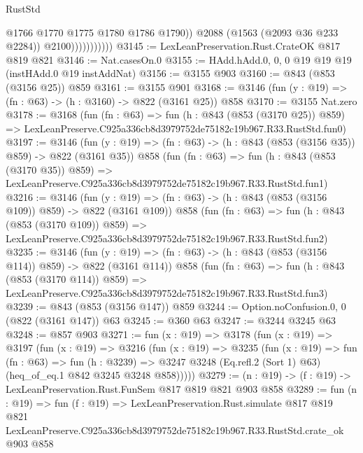 \begin{lexlean}{RustStd}
\begin{coremodule}
                              @1766
                              @1770
                              @1775
                              @1780
                              @1786
                              @1790))
                          @2088
                          (@1563 (@2093 @36 @233 @2284))
                          @2100)))))))))))
@3145 := LexLeanPreservation.Rust.CrateOK @817 @819 @821
@3146 := Nat.casesOn.{0}
@3155 := HAdd.hAdd.{0, 0, 0} @19 @19 @19 (instHAdd.{0} @19 instAddNat)
@3156 := @3155 @903
@3160 := @843 (@853 (@3156 @25)) @859
@3161 := @3155 @901
@3168 := @3146 (fun (y : @19) => (fn : @63) -> (h : @3160) -> @822 (@3161 @25)) @858
@3170 := @3155 Nat.zero
@3178 := @3168
    (fun (fn : @63) =>
    fun (h : @843 (@853 (@3170 @25)) @859) =>
    LexLeanPreserve.C925a336cb8d3979752de75182c19b967.R33.RustStd.fun0)
@3197 := @3146
    (fun (y : @19) => (fn : @63) -> (h : @843 (@853 (@3156 @35)) @859) -> @822 (@3161 @35))
    @858
    (fun (fn : @63) =>
    fun (h : @843 (@853 (@3170 @35)) @859) =>
    LexLeanPreserve.C925a336cb8d3979752de75182c19b967.R33.RustStd.fun1)
@3216 := @3146
    (fun (y : @19) => (fn : @63) -> (h : @843 (@853 (@3156 @109)) @859) -> @822 (@3161 @109))
    @858
    (fun (fn : @63) =>
    fun (h : @843 (@853 (@3170 @109)) @859) =>
    LexLeanPreserve.C925a336cb8d3979752de75182c19b967.R33.RustStd.fun2)
@3235 := @3146
    (fun (y : @19) => (fn : @63) -> (h : @843 (@853 (@3156 @114)) @859) -> @822 (@3161 @114))
    @858
    (fun (fn : @63) =>
    fun (h : @843 (@853 (@3170 @114)) @859) =>
    LexLeanPreserve.C925a336cb8d3979752de75182c19b967.R33.RustStd.fun3)
@3239 := @843 (@853 (@3156 @147)) @859
@3244 := Option.noConfusion.{0, 0} (@822 (@3161 @147)) @63
@3245 := @360 @63
@3247 := @3244 @3245 @63
@3248 := @857 @903
@3271 := fun (x : @19) =>
  @3178
    (fun (x : @19) =>
    @3197
      (fun (x : @19) =>
      @3216
        (fun (x : @19) =>
        @3235
          (fun (x : @19) =>
          fun (fn : @63) =>
          fun (h : @3239) =>
          @3247 @3248 (Eq.refl.{2} (Sort 1) @63) (heq_of_eq.{1} @842 @3245 @3248 @858)))))
@3279 := (n : @19) -> (f : @19) -> LexLeanPreservation.Rust.FunSem @817 @819 @821 @903 @858
@3289 := fun (n : @19) =>
  fun (f : @19) =>
  LexLeanPreservation.Rust.simulate
    @817
    @819
    @821
    LexLeanPreserve.C925a336cb8d3979752de75182c19b967.R33.RustStd.crate_ok
    @903
    @858
\end{coremodule}
\end{lexlean}
